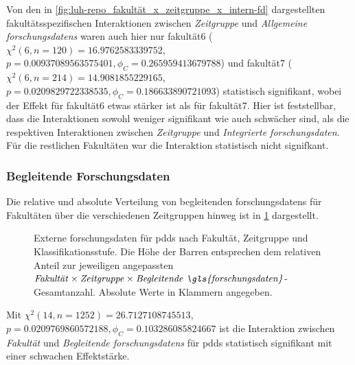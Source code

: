 Von den in \cref{fig:luh-repo_fakultät_x_zeitgruppe_x_intern-fd} dargestellten fakultätsspezifischen Interaktionen zwischen \textit{Zeitgruppe} und \textit{Allgemeine \glspl{forschungsdaten}} waren auch hier nur \gls{fakultät6} ($\chi^2 (\num{6}, n=\num{120}) = \num[round-mode=places,round-precision=2]{16.9762583339752}$, $p = \num[round-mode=places,round-precision=2]{0.00937089563575401},\phi_C=\num[round-mode=places,round-precision=2]{0.265959413679788}$) und \gls{fakultät7} ($\chi^2 (\num{6}, n=\num{214}) = \num[round-mode=places,round-precision=2]{14.9081855229165}$, $p = \num[round-mode=places,round-precision=2]{0.0209829722338535},\phi_C=\num[round-mode=places,round-precision=2]{0.186633890721093}$) statistisch signifikant, wobei der Effekt für \gls{fakultät6} etwas stärker ist als für \gls{fakultät7}.
Hier ist feststellbar, dass die Interaktionen sowohl weniger signifikant wie auch schwächer sind, als die respektiven Interaktionen zwischen \textit{Zeitgruppe} und \textit{Integrierte \gls{forschungsdaten}}.
Für die restlichen Fakultäten war die Interaktion statistisch nicht signifkant.

\subsubsection{Begleitende Forschungsdaten}
Die relative und absolute Verteilung von begleitenden \glspl{forschungsdaten} für Fakultäten über die verschiedenen Zeitgruppen hinweg ist in \cref{fig:luh-repo_fakultät_x_zeitgruppe_x_begleit-fd} dargestellt.
\begin{figure}[!htbp]
    \resizebox{\ifdim\width>\textwidth\textwidth\else\width\fi}{!}{}
    \caption{Externe \gls{forschungsdaten} für \glspl{pdd} nach Fakultät, Zeitgruppe und Klassifikationsstufe.
    Die Höhe der Barren entsprechen dem relativen Anteil zur jeweiligen angepassten $\text{\textit{Fakultät}}\times\text{\textit{Zeitgruppe}}\times\text{\textit{Begleitende \gls{forschungsdaten}}}$-Gesamtanzahl.
    Absolute Werte in Klammern angegeben.}
    \label{fig:luh-repo_fakultät_x_zeitgruppe_x_begleit-fd}
\end{figure}
Mit $\chi^2 (\num{14}, n=\num{1252}) = \num[round-mode=places,round-precision=2]{26.7127108745513}$, $p = \num[round-mode=places,round-precision=2]{0.0209769860572188},\phi_C=\num[round-mode=places,round-precision=2]{0.103286085824667}$ ist die Interaktion zwischen \textit{Fakultät} und \textit{Begleitende \glspl{forschungsdaten}} für \glspl{pdd} statistisch signifikant mit einer schwachen Effektstärke.

